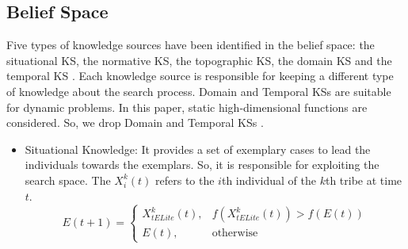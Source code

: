 \documentclass[letterpaper]{article}
\begin{document}
\subsection{Belief Space}
Five types of knowledge sources have been identified in the belief space: the situational KS, the normative KS, the topographic KS, the domain KS and the temporal KS \cite{king2008embedding}. Each knowledge source is responsible for keeping a different type of knowledge about the search process. Domain and Temporal KSs are suitable for dynamic problems. In this paper, static high-dimensional functions are considered. So, we drop Domain and Temporal KSs \cite{ali2016leveraged}.  
\begin{itemize}
	\item Situational Knowledge: It provides a set of exemplary cases to lead the individuals towards the exemplars. So, it is responsible for exploiting the search space. The $X_{i}^{k}(t)$ refers to the $i$th individual of the $k$th tribe at time $t$.
	\begin{equation}
	E(t+1) = \begin{cases} 
				X^{k}_{tELite}(t), & f(X^{k}_{tELite}(t))>f(E(t)) \\ E(t), & \mbox{otherwise} 
			 \end{cases}
	\end{equation}
	

\end{itemize}
\end{document}
